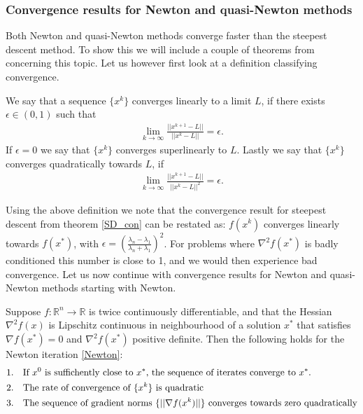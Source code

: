\subsubsection{Convergence results for Newton and quasi-Newton methods}
Both Newton and quasi-Newton methods converge faster than the steepest descent method. To show this we will include a couple of theorems from \cite{nocedal2006numerical}
concerning this topic. Let us however first look at a definition classifying convergence.
\begin{definition}
We say that a sequence $\{x^k\}$ converges linearly to a limit $L$, if there exists $\epsilon\in(0,1)$ such that
\begin{align*}
\lim_{k\rightarrow\infty}\frac{||x^{k+1}-L||}{||x^k-L||} =\epsilon.
\end{align*} 
If $\epsilon=0$ we say that $\{x^k\}$ converges superlinearly to $L$. Lastly we say that $\{x^k\}$ converges quadratically towards $L$, if
\begin{align*}
\lim_{k\rightarrow\infty}\frac{||x^{k+1}-L||}{||x^k-L||^2} =\epsilon.
\end{align*}
\end{definition}
Using the above definition we note that the convergence result for steepest descent from theorem \ref{SD_con} can be restated as: $f(x^k)$ converges linearly towards $f(x^*)$, with $\epsilon=(\frac{\lambda_n-\lambda_1}{\lambda_n+\lambda_1})^2$. For problems where $\nabla^2 f(x^*)$ is badly conditioned this number is close to 1, and we would then experience bad convergence. Let us now continue with convergence results for Newton and quasi-Newton methods starting with Newton.
\begin{theorem}
\label{Newton_con}
Suppose $f:\mathbb{R}^n\rightarrow\mathbb{R}$ is twice continuously differentiable, and that the Hessian $\nabla^2 f(x)$ is Lipschitz continuous in neighbourhood of a solution $x^*$ that satisfies $\nabla f(x^*)=0$ and $\nabla^2 f(x^*)$ positive definite. Then the following holds for the Newton iteration \ref{Newton}:
\begin{align*}
1.\quad&\textrm{If $x^0$ is suffichently close to $x^*$, the sequence of iterates converge to $x^*$.}\\
2.\quad&\textrm{The rate of convergence of $\{x^k\}$ is quadratic}\\
3.\quad&\textrm{The sequence of gradient norms $ \{||\nabla f(x^k)||\}$ converges towards zero quadratically}
\end{align*}
\end{theorem}
